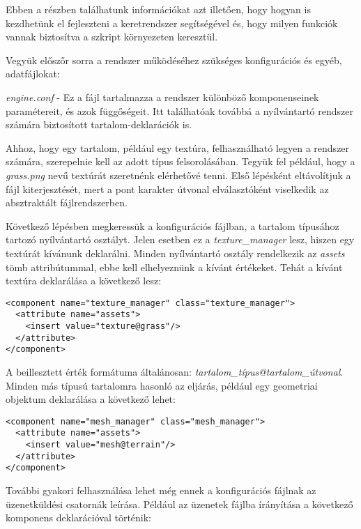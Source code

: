 \label{Chap:api}

Ebben a részben találhatunk információkat azt illetően, hogy hogyan is kezdhetünk el fejleszteni a keretrendszer segítségével és, hogy milyen funkciók vannak biztosítva a szkript környezeten keresztül.


Vegyük előszőr sorra a rendszer működéséhez szükséges konfigurációs és egyéb, adatfájlokat:
\begin{description}
\item \textit{engine.conf} - Ez a fájl tartalmazza a rendszer különböző komponenseinek paramétereit, és azok függőségeit. Itt találhatóak továbbá a nyílvántartó rendszer számára biztosított tartalom-deklarációk is.

Ahhoz, hogy egy tartalom, például egy textúra, felhasználható legyen a rendszer számára, szerepelnie kell az adott típus felsorolásában. Tegyük fel például, hogy a \textit{grass.png} nevű textúrát szeretnénk elérhetővé tenni. Első lépésként eltávolítjuk a fájl kiterjesztését, mert a pont karakter útvonal elválasztóként viselkedik az absztraktált fájlrendszerben.

Következő lépésben megkeressük a konfigurációs fájlban, a tartalom típusához tartozó nyílvántartó osztályt. Jelen esetben ez a \textit{texture_manager} lesz, hiszen egy textúrát kívánunk deklarálni. Minden nyílvántartó osztály rendelkezik az \textit{assets} tömb attribútummal, ebbe kell elhelyeznünk a kívánt értékeket. Tehát a kívánt textúra deklarálása a következő lesz:

\begin{lstlisting}
<component name="texture_manager" class="texture_manager">
  <attribute name="assets">
    <insert value="texture@grass"/>
  </attribute>
</component>
\end{lstlisting}

A beillesztett érték formátuma általánosan: \textit{tartalom_típus@tartalom_útvonal}. Minden más típusú tartalomra hasonló az eljárás, például egy geometriai objektum deklarálása a következő lehet:

\begin{lstlisting}
<component name="mesh_manager" class="mesh_manager">
  <attribute name="assets"> 
    <insert value="mesh@terrain"/>
  </attribute>
</component>
\end{lstlisting}

További gyakori felhasználása lehet még ennek a konfigurációs fájlnak az üzenetküldési csatornák leírása. Például az üzenetek fájlba írányítása a következő komponens deklarációval történik:


\end{description}
